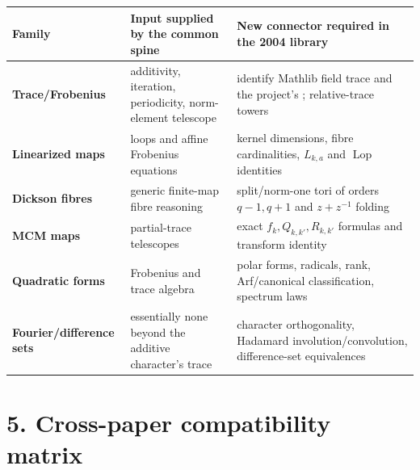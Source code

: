 \documentclass[10pt]{article}
\newcommand{\file}[1]{\texttt{\detokenize{#1}}}
\begin{document}
\begin{tabularx}{\linewidth}{>{\bfseries}p{31mm} X X}
\toprule
Family & Input supplied by the common spine & New connector required in the 2004 library \\
\midrule
Trace/Frobenius & additivity, iteration, periodicity, norm-element telescope & identify Mathlib field trace and the project's \file{Tr}; relative-trace towers\\
Linearized maps & loops and affine Frobenius equations & kernel dimensions, fibre cardinalities, $L_{k,a}$ and $\operatorname{Lop}$ identities\\
Dickson fibres & generic finite-map fibre reasoning & split/norm-one tori of orders $q-1,q+1$ and $z+z^{-1}$ folding\\
MCM maps & partial-trace telescopes & exact $f_k,Q_{k,k'},R_{k,k'}$ formulas and transform identity\\
Quadratic forms & Frobenius and trace algebra & polar forms, radicals, rank, Arf/canonical classification, spectrum laws\\
Fourier/difference sets & essentially none beyond the additive character's trace & character orthogonality, Hadamard involution/convolution, difference-set equivalences\\
\bottomrule
\end{tabularx}
\newpage

\section*{5. Cross-paper compatibility matrix}
\end{document}
